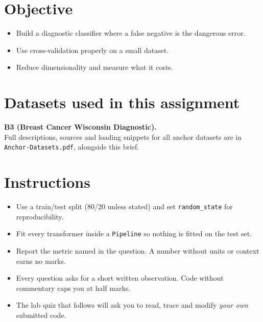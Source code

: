 \documentclass[11pt,a4paper]{article}
\begin{document}

\section*{Objective}

\begin{itemize}[leftmargin=*]

  \item Build a diagnostic classifier where a false negative is the dangerous error.

  \item Use cross-validation properly on a small dataset.

  \item Reduce dimensionality and measure what it costs.

\end{itemize}

\section*{Datasets used in this assignment}

\textbf{B3 (Breast Cancer Wisconsin Diagnostic).}\\ Full descriptions, sources and loading snippets for all anchor datasets are in \texttt{Anchor-Datasets.pdf}, alongside this brief.

\section*{Instructions}

\begin{itemize}[leftmargin=*]

  \item Use a train/test split (80/20 unless stated) and set \texttt{random\_state} for reproducibility.

  \item Fit every transformer inside a \texttt{Pipeline} so nothing is fitted on the test set.

  \item Report the metric named in the question. A number without units or context earns no marks.

  \item Every question asks for a short written observation. Code without commentary caps you at half marks.

  \item The lab quiz that follows will ask you to read, trace and modify \emph{your own} submitted code.

\end{itemize}
\end{document}
